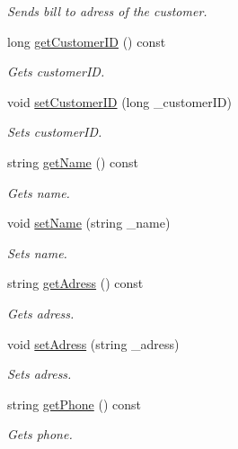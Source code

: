 \begin{DoxyCompactItemize}
\begin{DoxyCompactList}\small\item\em Sends bill to adress of the customer. \end{DoxyCompactList}\item 
long \hyperlink{classCustomer_a8cbfbca1770ee78aea3083b9a61a547c}{get\+Customer\+ID} () const 
\begin{DoxyCompactList}\small\item\em Gets customer\+ID. \end{DoxyCompactList}\item 
void \hyperlink{classCustomer_acc7237a0121638d38846465ee9c2d26a}{set\+Customer\+ID} (long \+\_\+customer\+ID)
\begin{DoxyCompactList}\small\item\em Sets customer\+ID. \end{DoxyCompactList}\item 
string \hyperlink{classCustomer_a059a5634b4200f56a249051954b90508}{get\+Name} () const 
\begin{DoxyCompactList}\small\item\em Gets name. \end{DoxyCompactList}\item 
void \hyperlink{classCustomer_a57953fc7e96939d1937fc7603aa31406}{set\+Name} (string \+\_\+name)
\begin{DoxyCompactList}\small\item\em Sets name. \end{DoxyCompactList}\item 
string \hyperlink{classCustomer_a28f1e72db25c71110fee87c3a090c913}{get\+Adress} () const 
\begin{DoxyCompactList}\small\item\em Gets adress. \end{DoxyCompactList}\item 
void \hyperlink{classCustomer_adfc9ac7abfa4bb4835106dc35739a4a6}{set\+Adress} (string \+\_\+adress)
\begin{DoxyCompactList}\small\item\em Sets adress. \end{DoxyCompactList}\item 
string \hyperlink{classCustomer_abc083c1bd5bcf45d92b6ddde346a66ba}{get\+Phone} () const 
\begin{DoxyCompactList}\small\item\em Gets phone. \end{DoxyCompactList}\item 

\end{DoxyCompactItemize}

